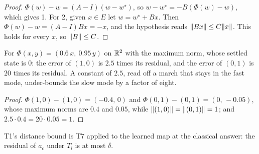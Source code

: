 \begin{proof}
  \leanok
  $\Phi(w)-w=(A-I)(w-w^\star)$, so $w-w^\star=-B(\Phi(w)-w)$, which gives 1.
  For 2, given $x\in E$ let $w=w^\star+Bx$.  Then
  $\Phi(w)-w=(A-I)Bx=-x$, and the hypothesis reads $\lVert Bx\rVert\le C\lVert x\rVert$.
  This holds for every $x$, so $\lVert B\rVert\le C$.
\end{proof}

\begin{example}\label{ex:T7-two-mode}
  \leanok
  For $\Phi(x,y)=(0.6\,x,\ 0.95\,y)$ on $\mathbb{R}^2$ with the maximum norm, whose
  settled state is $0$: the error of $(1,0)$ is $2.5$ times its residual, and
  the error of $(0,1)$ is $20$ times its residual.  A constant of $2.5$, read
  off a march that stays in the fast mode, under-bounds the slow mode by a
  factor of eight.
\end{example}

\begin{proof}
  \leanok
  $\Phi(1,0)-(1,0)=(-0.4,\,0)$ and $\Phi(0,1)-(0,1)=(0,\,-0.05)$, whose maximum
  norms are $0.4$ and $0.05$, while $\lVert (1,0)\rVert=\lVert (0,1)\rVert=1$; and
  $2.5\cdot0.4=20\cdot0.05=1$.
\end{proof}

\begin{remark}
  T1's distance bound is T7 applied to the learned map at the classical answer:
  the residual of $a_c$ under $T_l$ is at most $\delta$.
\end{remark}
